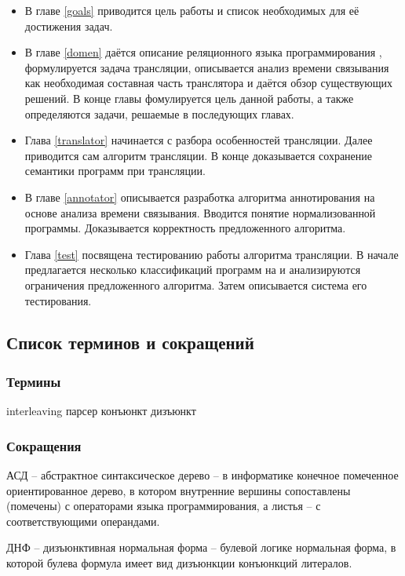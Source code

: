 \begin{itemize}
    \item В главе \ref{goals} приводится цель работы и список необходимых для её достижения задач.

    \item В главе \ref{domen} даётся описание реляционного языка программирования \miniKanren{}, формулируется задача трансляции, описывается анализ времени связывания как необходимая составная часть транслятора и даётся обзор существующих решений. В конце главы фомулируется цель данной работы, а также определяются задачи, решаемые в последующих главах.

    \item Глава \ref{translator} начинается с разбора особенностей трансляции. Далее приводится сам алгоритм трансляции. В конце доказывается сохранение семантики программ при трансляции.

    \item В главе \ref{annotator} описывается разработка алгоритма аннотирования на основе анализа времени связывания. Вводится понятие нормализованной программы. Доказывается корректность предложенного алгоритма.

    \item Глава \ref{test} посвящена тестированию работы алгоритма трансляции. В начале предлагается несколько классификаций программ на \miniKanren{} и анализируются ограничения предложенного алгоритма. Затем описывается система его тестирования.
\end{itemize}

\subsection*{Список терминов и сокращений}

\subsubsection*{Термины}

interleaving
парсер
конъюнкт
дизъюнкт


\subsubsection*{Сокращения}

АСД -- абстрактное синтаксическое дерево -- в информатике конечное помеченное ориентированное дерево, в котором внутренние вершины сопоставлены (помечены) с операторами языка программирования, а листья -- с соответствующими операндами.

ДНФ -- дизъюнктивная нормальная форма -- булевой логике нормальная форма, в которой булева формула имеет вид дизъюнкции конъюнкций литералов.
